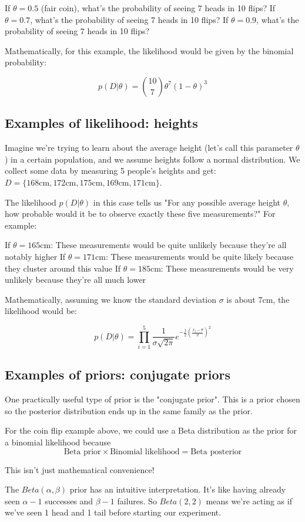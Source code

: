 If $\theta = 0.5$ (fair coin), what's the probability of seeing 7 heads in 10 flips?
If $\theta = 0.7$, what's the probability of seeing 7 heads in 10 flips?
If $\theta = 0.9$, what's the probability of seeing 7 heads in 10 flips?

Mathematically, for this example, the likelihood would be given by the binomial probability:

$$
p(D|\theta) = \binom{10}{7} \theta^7 \left(1-\theta\right)^{3}
$$

\subsection{Examples of likelihood: heights}

Imagine we're trying to learn about the average height (let's call this parameter $\theta$) in a certain population, and we assume heights follow a normal distribution. We collect some data by measuring 5 people's heights and get:
$D = \{ 168\text{cm}, 172\text{cm}, 175\text{cm}, 169\text{cm}, 171\text{cm} \}$.

The likelihood $p(D|\theta)$ in this case tells us "For any possible average height $\theta$,
how probable would it be to observe exactly these five measurements?"
For example:

If $\theta = 165\text{cm}$: These measurements would be quite unlikely because they're all notably higher
If $\theta = 171\text{cm}$: These measurements would be quite likely because they cluster around this value
If $\theta = 185\text{cm}$: These measurements would be very unlikely because they're all much lower

Mathematically, assuming we know the standard deviation $\sigma$ is about 7cm, the likelihood would be:

$$
p(D|\theta) = 
\prod_{i=1}^{5} \frac{1}{\sigma \sqrt{2\pi}} e^{-\frac{1}{2} \left(\frac{x_i - \theta}{\sigma}\right)^2 }
$$


\subsection{Examples of priors: conjugate priors}

One practically useful type of prior is the "conjugate prior".
This is a prior chosen so the posterior distribution ends up in the same family as the prior.

For the coin flip example above, we could use a Beta distribution as the prior for a
binomial likelihood because
$$
\text{Beta prior} \times \text{Binomial likelihood} = \text{Beta posterior}
$$

This isn't just mathematical convenience!

The $Beta(\alpha, \beta)$ prior has an intuitive interpretation.
It's like having already seen $\alpha -1$ successes and $\beta -1$ failures.
So $Beta(2, 2)$ means we're acting as if we've seen 1 head and 1 tail before starting our experiment.